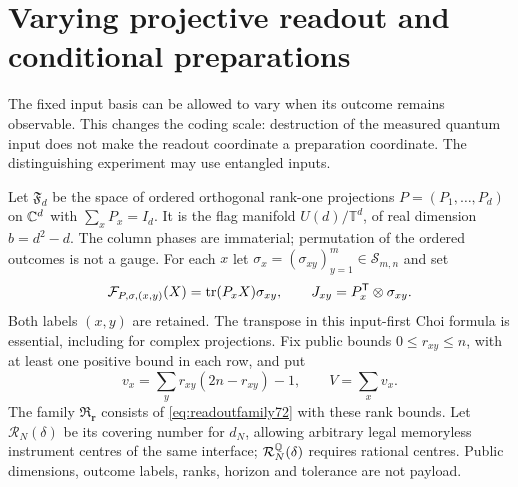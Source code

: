 \section{Varying projective readout and conditional preparations}\label{sec:readout72}
The fixed input basis can be allowed to vary when its outcome remains
observable. This changes the coding scale: destruction of the measured
quantum input does not make the readout coordinate a preparation
coordinate. The distinguishing experiment may use entangled inputs.

Let $\mathfrak F_d$ be the space of ordered orthogonal rank-one
projections $P=(P_1,\ldots,P_d)$ on $\mathbb C^d$ with $\sum_xP_x=I_d$.
It is the flag manifold $U(d)/\mathbb T^d$, of real dimension
$b=d^2-d$. The column phases are immaterial; permutation of the
ordered outcomes is not a gauge. For each $x$ let
$\sigma_x=(\sigma_{xy})_{y=1}^m\in\mathcal S_{m,n}$ and set
\begin{equation}\label{eq:readoutfamily72}
 \mathcal F_{P,\sigma,(x,y)}(X)=\operatorname{tr}(P_xX)\sigma_{xy},\qquad
 J_{xy}=P_x^{\mathsf T}\otimes\sigma_{xy}.
\end{equation}
Both labels $(x,y)$ are retained. The transpose in this input-first
Choi formula is essential, including for complex projections. Fix
public bounds $0\le r_{xy}\le n$, with at least one positive bound
in each row, and put
\[
 v_x=\sum_y r_{xy}(2n-r_{xy})-1,\qquad V=\sum_xv_x.
\]
The family $\mathfrak R_{\boldsymbol r}$ consists of
\eqref{eq:readoutfamily72} with these rank bounds. Let
$\mathcal R_N(\delta)$ be its covering number for $d_N$, allowing
arbitrary legal memoryless instrument centres of the same interface;
$\mathcal R_N^{\mathbb Q}(\delta)$ requires rational centres. Public dimensions,
outcome labels, ranks, horizon and tolerance are not payload.


